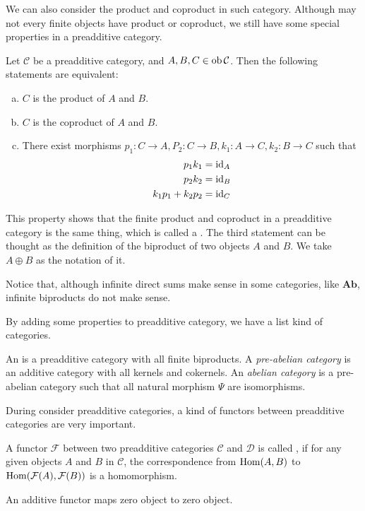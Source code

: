 We can also consider the product and coproduct in such category. Although may not every finite objects have product or coproduct, we still have some special properties in a preadditive category.
\begin{prop}
  Let $\mathcal{C}$ be a preadditive category, and $A,B,C\in\operatorname{ob}\mathcal{C}$. Then the following statements are equivalent:
  \begin{enumerate}[a)]
    \setlength{\itemindent}{2ex}
    \item $C$ is the product of $A$ and $B$.
    \item $C$ is the coproduct of $A$ and $B$.
    \item There exist morphisms $p_1\colon C\to A,P_2\colon C\to B,k_1\colon A\to C,k_2\colon B\to C$ such that
    \begin{align*}
      p_1k_1&=\operatorname{id}_A\\
      p_2k_2&=\operatorname{id}_B\\
      k_1p_1+k_2p_2&=\operatorname{id}_C
    \end{align*}
  \end{enumerate}
\end{prop}
This property shows that the finite product and coproduct in a preadditive category is the same thing, which is called a . The third statement can be thought as the definition of the biproduct of two objects $A$ and $B$. We take $A\oplus B$ as the notation of it.
\begin{warn}
  Notice that, although infinite direct sums make sense in some categories, like $\mathbf{Ab}$, infinite biproducts do not make sense.
\end{warn}
By adding some properties to preadditive category, we have a list kind of categories.
\begin{defn}
  An  is a preadditive category with all finite biproducts. A \emph{\red  pre-abelian category} is an additive category with all kernels and cokernels. An \emph{\red  abelian category} is a pre-abelian category such that all natural morphism $\Psi$ are isomorphisms.
\end{defn}
During consider preadditive categories, a kind of functors between preadditive categories are very important.
\begin{defn}
  A functor $\mathcal{F}$ between two preadditive categories $\mathcal{C}$ and $\mathcal{D}$ is called , if for any given objects $A$ and $B$ in $\mathcal{C}$, the correspondence from $\operatorname{Hom}(A,B)$ to $\operatorname{Hom}(\mathcal{F}(A),\mathcal{F}(B))$ is a homomorphism.
\end{defn}
\begin{prop}
  An additive functor maps zero object to zero object.
\end{prop}
